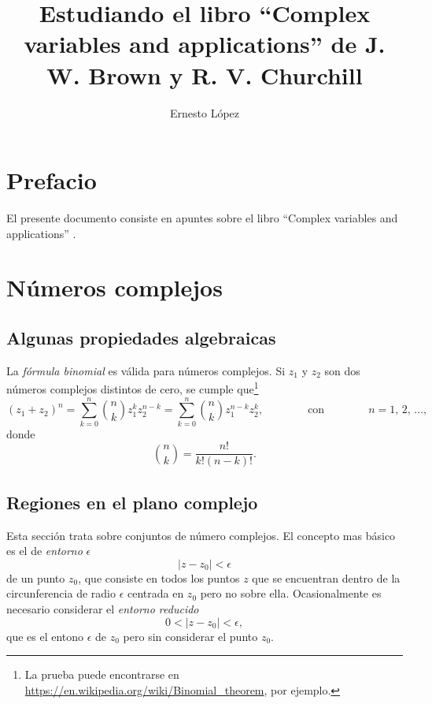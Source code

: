 \documentclass[a4paper]{report}
\title{Estudiando el libro ``Complex variables and applications''  de J. W. Brown y R. V. Churchill}
\author{Ernesto López}
\begin{document}
 

\hypersetup{pageanchor=false}
\maketitle
\hypersetup{pageanchor=true}
\tableofcontents


\chapter*{Prefacio}

El presente documento consiste en apuntes sobre el libro ``Complex variables and applications'' \cite{brown2013complex}.


\chapter{Números complejos}

\section{Algunas propiedades algebraicas}

La \emph{fórmula binomial} es válida para números complejos. Si \(z_1\) y \(z_2\) son dos números complejos distintos de cero, se cumple que\footnote{La prueba puede encontrarse en \url{https://en.wikipedia.org/wiki/Binomial_theorem}, por ejemplo.} 
\begin{equation}\label{eq:binomial_theorem}
 (z_1+z_2)^n=\sum_{k=0}^n\binom{n}{k}z_1^{k}z_2^{n-k}=\sum_{k=0}^n\binom{n}{k}z_1^{n-k}z_2^k,
 \qquad\qquad\textrm{con}\qquad\qquad
 n=1,\,2,\,\dots,
\end{equation}
donde
\[
 \binom{n}{k}=\frac{n!}{k!(n-k)!}.
\]

\section{Regiones en el plano complejo}\label{sec:complex_plane_regions}

Esta sección trata sobre conjuntos de número complejos. El concepto mas básico es el de \emph{entorno} \(\epsilon\)
\[
 |z-z_0|<\epsilon
\]
de un punto \(z_0\), que consiste en todos los puntos \(z\) que se encuentran dentro de la circunferencia de radio \(\epsilon\) centrada en \(z_0\) pero no sobre ella. Ocasionalmente es necesario considerar el \emph{entorno reducido}
\[
 0<|z-z_0|<\epsilon,
\]
que es el entono \(\epsilon\) de \(z_0\) pero sin considerar el punto \(z_0\).
\end{document}

